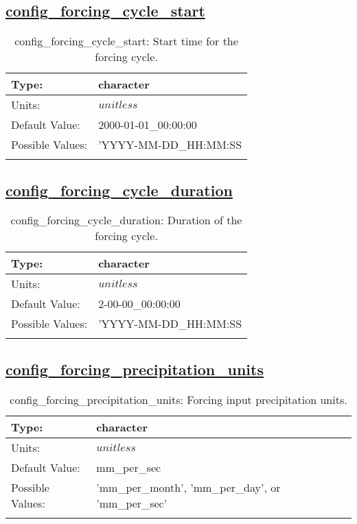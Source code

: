 \subsection[config\_forcing\_cycle\_start]{\hyperref[sec:nm_tab_forcing]{config\_forcing\_cycle\_start}}
\label{subsec:nm_sec_config_forcing_cycle_start}
\begin{center}
\begin{longtable}{| p{2.0in} || p{4.0in} |}
    \hline
    Type: & character \\
    \hline
    Units: & $unitless$ \\
    \hline
    Default Value: & 2000-01-01\_00:00:00 \\
    \hline
    Possible Values: & 'YYYY-MM-DD\_HH:MM:SS \\
    \hline
    \caption{config\_forcing\_cycle\_start: Start time for the forcing cycle.}
\end{longtable}
\end{center}
\subsection[config\_forcing\_cycle\_duration]{\hyperref[sec:nm_tab_forcing]{config\_forcing\_cycle\_duration}}
\label{subsec:nm_sec_config_forcing_cycle_duration}
\begin{center}
\begin{longtable}{| p{2.0in} || p{4.0in} |}
    \hline
    Type: & character \\
    \hline
    Units: & $unitless$ \\
    \hline
    Default Value: & 2-00-00\_00:00:00 \\
    \hline
    Possible Values: & 'YYYY-MM-DD\_HH:MM:SS \\
    \hline
    \caption{config\_forcing\_cycle\_duration: Duration of the forcing cycle.}
\end{longtable}
\end{center}
\subsection[config\_forcing\_precipitation\_units]{\hyperref[sec:nm_tab_forcing]{config\_forcing\_precipitation\_units}}
\label{subsec:nm_sec_config_forcing_precipitation_units}
\begin{center}
\begin{longtable}{| p{2.0in} || p{4.0in} |}
    \hline
    Type: & character \\
    \hline
    Units: & $unitless$ \\
    \hline
    Default Value: & mm\_per\_sec \\
    \hline
    Possible Values: & 'mm\_per\_month', 'mm\_per\_day', or 'mm\_per\_sec' \\
    \hline
    \caption{config\_forcing\_precipitation\_units: Forcing input precipitation units.}
\end{longtable}
\end{center}
